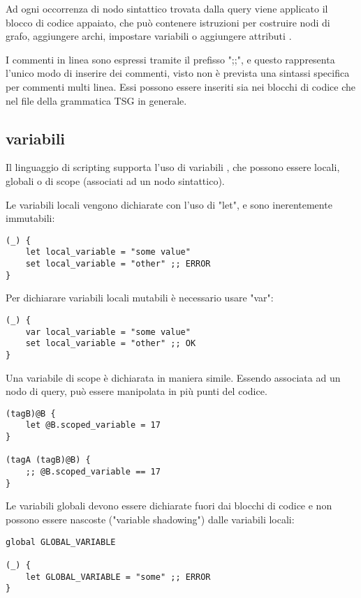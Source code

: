 Ad ogni occorrenza di nodo sintattico trovata dalla query viene applicato il blocco di codice appaiato, che pu\`o contenere istruzioni per costruire nodi di grafo, aggiungere archi, impostare variabili o aggiungere attributi \cite{TreeSitterGraphReferenceTerminology}.

I commenti in linea sono espressi tramite il prefisso ";;", e questo rappresenta l'unico modo di inserire dei commenti, visto non \`e prevista una sintassi specifica per commenti multi linea.
Essi possono essere inseriti sia nei blocchi di codice che nel file della grammatica TSG in generale.

\subsection{variabili}
Il linguaggio di scripting supporta l'uso di variabili \cite{TreeSitterGraphReferenceVariables}, che possono essere locali, globali o di scope (associati ad un nodo sintattico).

Le variabili locali vengono dichiarate con l'uso di "let", e sono inerentemente immutabili:

\begin{lstlisting}
(_) {
    let local_variable = "some value"
    set local_variable = "other" ;; ERROR
}
\end{lstlisting}

Per dichiarare variabili locali mutabili \`e necessario usare "var":

\begin{lstlisting}
(_) {
    var local_variable = "some value"
    set local_variable = "other" ;; OK
}
\end{lstlisting}

Una variabile di scope \`e dichiarata in maniera simile. Essendo associata ad un nodo di query, pu\`o essere manipolata in pi\`u punti del codice.

\begin{lstlisting}
(tagB)@B {
    let @B.scoped_variable = 17
}

(tagA (tagB)@B) {
    ;; @B.scoped_variable == 17
}
\end{lstlisting}

Le variabili globali devono essere dichiarate fuori dai blocchi di codice e non possono essere nascoste ("variable shadowing") dalle variabili locali:

\begin{lstlisting}
global GLOBAL_VARIABLE

(_) {
    let GLOBAL_VARIABLE = "some" ;; ERROR
}
\end{lstlisting}

